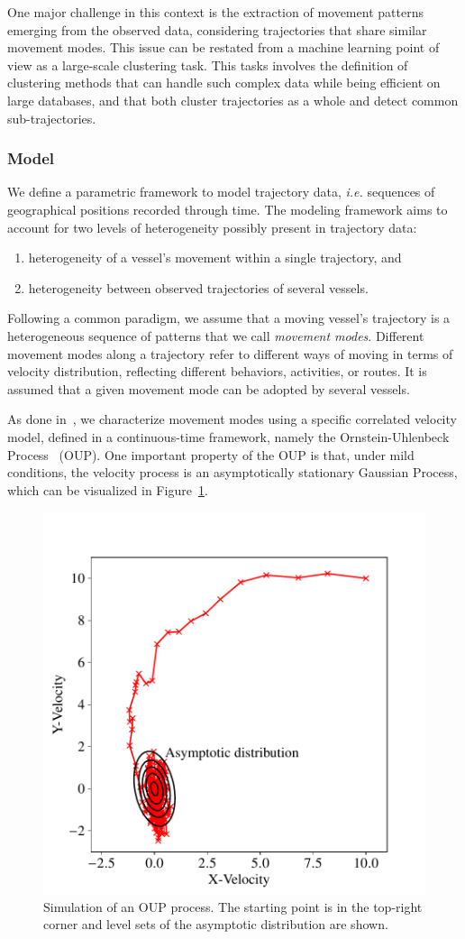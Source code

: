 One major challenge in this context is the extraction of movement patterns
emerging from the observed data, considering trajectories that share similar
movement modes.
This issue can be restated from a machine learning point of view as a
large-scale clustering task.
This tasks involves the definition of clustering methods
that can handle such complex data while being efficient on large databases,
and that both cluster trajectories as a whole and detect common
sub-trajectories.

\subsubsection{Model}

We define a parametric framework to model trajectory data,
\emph{i.e.} sequences of geographical positions recorded through time.
The modeling framework aims to account for two levels of heterogeneity possibly
present in trajectory data:

\begin{enumerate}
\item heterogeneity of a vessel's movement within a single trajectory, and
\item heterogeneity between observed trajectories of several vessels.
\end{enumerate}

Following a common paradigm, we assume that a moving vessel's trajectory
is a heterogeneous sequence of patterns that we call \emph{movement modes}.
Different movement modes along a trajectory refer to different ways of moving
in terms of velocity distribution, reflecting different behaviors, activities,
or routes.
It is assumed that a given movement mode can be adopted by several vessels.

As done in~\cite{gurarie2017correlated}, we characterize
movement modes using a specific correlated velocity model, defined in a
continuous-time framework, namely the Ornstein-Uhlenbeck
Process~\cite{uhlenbeck1930theory} (OUP).
One important property of the OUP is that, under mild conditions,
the velocity process is an asymptotically stationary Gaussian Process, which
can be visualized in Figure~\ref{fig:oup}.

\begin{figure}
\centering
\includegraphics[width=.5\textwidth]{fig/oup}
\caption{Simulation of an OUP process. The starting point is in the
top-right corner and level sets of the asymptotic distribution are shown.
\label{fig:oup}}
\end{figure}

